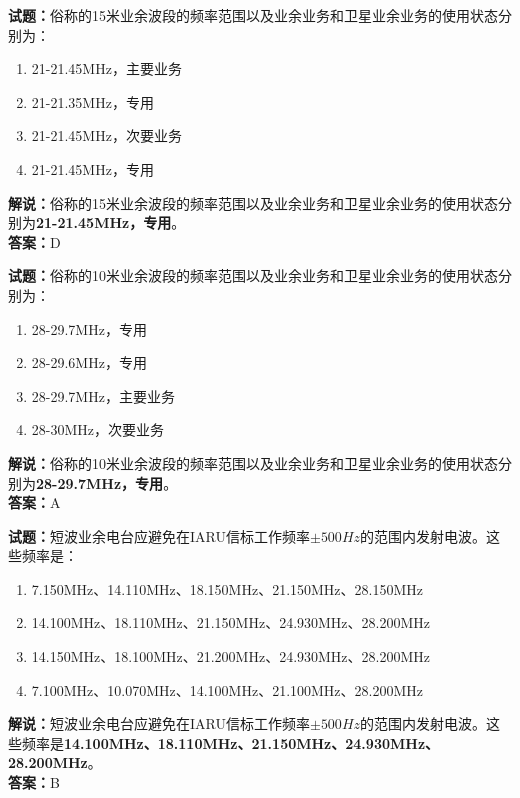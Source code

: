 \documentclass{ctexbook}
\begin{document}
\vspace{1em}

\textbf{试题：}俗称的15米业余波段的频率范围以及业余业务和卫星业余业务的使用状态分别为：
\begin{enumerate}[leftmargin=3em]
  \item 21-21.45\unit{\MHz}，主要业务
  \item 21-21.35\unit{\MHz}，专用
  \item 21-21.45\unit{\MHz}，次要业务
  \item 21-21.45\unit{\MHz}，专用
\end{enumerate}
\noindent\textbf{解说：}俗称的15米业余波段的频率范围以及业余业务和卫星业余业务的使用状态分别为\textbf{21-21.45\unit{\MHz}，专用}。\\\noindent\textbf{答案：}D

\vspace{1em}

\textbf{试题：}俗称的10米业余波段的频率范围以及业余业务和卫星业余业务的使用状态分别为：
\begin{enumerate}[leftmargin=3em]
  \item 28-29.7\unit{\MHz}，专用
  \item 28-29.6\unit{\MHz}，专用
  \item 28-29.7\unit{\MHz}，主要业务
  \item 28-30\unit{\MHz}，次要业务
\end{enumerate}
\noindent\textbf{解说：}俗称的10米业余波段的频率范围以及业余业务和卫星业余业务的使用状态分别为\textbf{28-29.7\unit{\MHz}，专用}。\\\noindent\textbf{答案：}A

\vspace{1em}

\textbf{试题：}短波业余电台应避免在IARU信标工作频率\( \pm 500Hz\)的范围内发射电波。这些频率是：%
\begin{enumerate}[leftmargin=3em]
  \item 7.150\unit{\MHz}、14.110\unit{\MHz}、18.150\unit{\MHz}、21.150\unit{\MHz}、28.150\unit{\MHz}
  \item 14.100\unit{\MHz}、18.110\unit{\MHz}、21.150\unit{\MHz}、24.930\unit{\MHz}、28.200\unit{\MHz}
  \item 14.150\unit{\MHz}、18.100\unit{\MHz}、21.200\unit{\MHz}、24.930\unit{\MHz}、28.200\unit{\MHz}
  \item 7.100\unit{\MHz}、10.070\unit{\MHz}、14.100\unit{\MHz}、21.100\unit{\MHz}、28.200\unit{\MHz}
\end{enumerate}
\noindent\textbf{解说：}短波业余电台应避免在IARU信标工作频率\( \pm 500Hz\)的范围内发射电波。这些频率是\textbf{14.100\unit{\MHz}、18.110\unit{\MHz}、21.150\unit{\MHz}、24.930\unit{\MHz}、28.200\unit{\MHz}}。\\\noindent\textbf{答案：}B%
\end{document}
